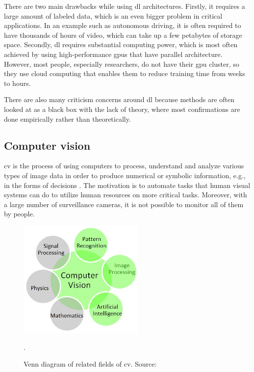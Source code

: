         There are two main drawbacks while using \gls{dl} architectures. Firstly, it requires a large amount of labeled data, which is an even bigger problem in critical applications. In an example such as autonomous driving, it is often required to have thousands of hours of video, which can take up a few petabytes of storage space. Secondly, \gls{dl} requires substantial computing power, which is most often achieved by using high-performance \gls{gpu}s that have parallel architecture. However, most people, especially researchers, do not have their \gls{gpu} cluster, so they use cloud computing that enables them to reduce training time from weeks to hours. 
        
        There are also many criticism \cite{lecun2015deep, zheng2016survey} concerns around \gls{dl} because methods are often looked at as a black box with the lack of theory, where most confirmations are done empirically rather than theoretically.
        
    \subsection{Computer vision}
        \Gls{cv} is the process of using computers to process, understand and analyze various types of image data in order to produce numerical or symbolic information, e.g., in the forms of decisions \cite{Szeliski:2010:CVA:1941882}. The motivation is to automate tasks that human visual systems can do to utilize human resources on more critical tasks. Moreover, with a large number of surveillance cameras, it is not possible to monitor all of them by people. 
        
        
        \begin{figure}[ht]
            \centering
            \includegraphics[width=0.55\textwidth]{resources/computer_vision_venn.png}
            \caption{Venn diagram of related fields of \gls{cv}. Source: \cite{khandelwalcv}}.
            \label{fig:convolutional neural netwok}
        \end{figure}
        
